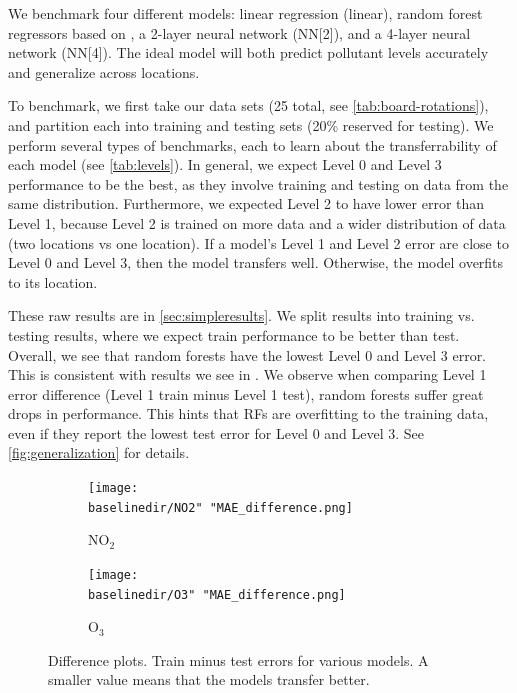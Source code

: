 \documentclass[journal abbreviation, manuscript]{copernicus}
\newcommand{\textus}[1]{$_{\text{#1}}$}
\begin{document}
We benchmark four different models: linear regression (linear), random forest regressors based on \citep{Zimmerman2018},
a 2-layer neural network (NN[2]), and a 4-layer neural network (NN[4]). The ideal model will
both predict pollutant levels accurately and
generalize across locations.

To benchmark, we first take our data sets (25 total, see \autoref{tab:board-rotations}), and partition each into training and testing sets (20\% reserved for testing).
We perform several types of benchmarks,
each to learn about the transferrability of each model (see \autoref{tab:levels}).
In general, we expect Level 0 and Level 3 performance to be the best, as they involve training and testing on data from the same distribution. Furthermore, we expected Level 2 to have lower error than Level 1, because Level 2 is trained on more data and a wider distribution of data (two locations vs one location).
If a model's Level 1 and Level 2 error are close to Level 0 and Level 3, then the model transfers well. Otherwise, the model overfits to its location.


These raw results are in \autoref{sec:simpleresults}. 
We split results into training vs. testing
results, where we expect train performance
to be better than test.
Overall, we see that random forests have the lowest Level 0 and Level 3 error. This is consistent with results we see in \citet{Zimmerman2018}. 
We observe when comparing Level 1 error difference (Level 1 train minus Level 1 test), random forests suffer great
drops in performance.
This hints that RFs are overfitting to the training data, even if they
report the lowest test error for Level 0 and Level 3.  See \autoref{fig:generalization} for 
details.

\begin{figure}[H]
\centering
\begin{subfigure}{0.45\textwidth}
\texttt{[image: \\baselinedir/NO2" "MAE\_difference.png]}
\caption{NO\textus{2}}
\end{subfigure}
\begin{subfigure}{0.45\textwidth}
\texttt{[image: \\baselinedir/O3" "MAE\_difference.png]}
\caption{O\textus{3}}
\end{subfigure}
\caption{Difference plots. Train minus test errors for various models. A smaller value means that the models transfer better.}
\label{fig:generalization}
\end{figure}
\end{document}
